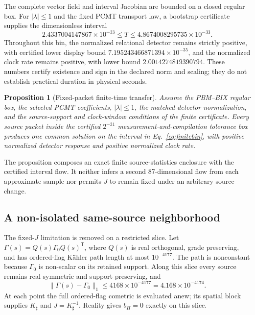\documentclass[11pt]{article}
\newtheorem{proposition}[theorem]{Proposition}
\theoremstyle{definition}
\theoremstyle{remark}
\begin{document}
The complete vector field and interval Jacobian are bounded on a closed regular box. For $|\lambda|\le1$ and the fixed PCMT transport law, a bootstrap certificate supplies the dimensionless interval
\begin{equation}\label{eq:finitebin}
  2.4337004147867\times10^{-33}\le T\le4.8674008295735\times10^{-33}.
\end{equation}
Throughout this bin, the normalized relational detector remains strictly positive, with certified lower display bound $7.195243466871394\times10^{-35}$, and the normalized clock rate remains positive, with lower bound $2.0014274819390794$. These numbers certify existence and sign in the declared norm and scaling; they do not establish practical duration in physical seconds.

\begin{proposition}[Fixed-packet finite-time transfer]\label{prop:packettransfer}
Assume the PBM--BIX regular box, the selected PCMT coefficients, $|\lambda|\le1$, the matched detector normalization, and the source-support and clock-window conditions of the finite certificate. Every source packet inside the certified $2^{-31}$ measurement-and-compilation tolerance box produces one common solution on the interval in Eq.~\eqref{eq:finitebin}, with positive normalized detector response and positive normalized clock rate.
\end{proposition}

The proposition composes an exact finite source-statistics enclosure with the certified interval flow. It neither infers a second 87-dimensional flow from each approximate sample nor permits $J$ to remain fixed under an arbitrary source change.

\subsection{A non-isolated same-source neighborhood}

The fixed-$J$ limitation is removed on a restricted slice. Let $\Gamma(s)=Q(s)\Gamma_0Q(s)^{\mathsf T}$, where $Q(s)$ is real orthogonal, grade preserving, and has ordered-flag K\"ahler path length at most $10^{-4177}$. The path is nonconstant because $\Gamma_0$ is non-scalar on its retained support. Along this slice every source remains real symmetric and support preserving, and
\begin{equation}
 \|\Gamma(s)-\Gamma_0\|_1\le4168\times10^{-4177}=4.168\times10^{-4174}.
\end{equation}
At each point the full ordered-flag cometric is evaluated anew; its spatial block supplies $K_\sharp$ and $J=K_\sharp^{-1}$. Reality gives $b_H=0$ exactly on this slice.
\end{document}
